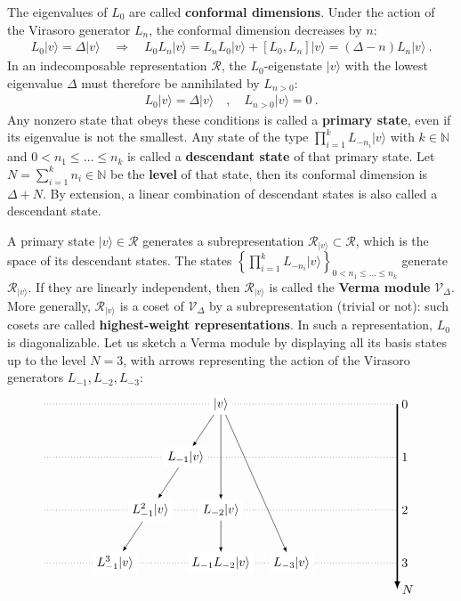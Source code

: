 \documentclass[12pt, a4paper]{article}
\theoremstyle{break}
\begin{document}
The eigenvalues of $L_0$ are called \textbf{conformal dimensions}. Under the action of the Virasoro generator $L_n$, the conformal dimension decreases by $n$:
\begin{align}
 L_0|v\rangle = \Delta|v\rangle \quad \Rightarrow\quad  L_0 L_n|v\rangle = L_nL_0|v\rangle + [L_0, L_n] |v\rangle  = (\Delta-n)L_n|v\rangle \ .
\end{align}
In an indecomposable representation $\mathcal{R}$, the $L_0$-eigenstate $|v\rangle$ with the lowest eigenvalue $\Delta$ must therefore be annihilated by $L_{n>0}$:
\begin{align}
  L_0 |v\rangle = \Delta |v\rangle \quad , \quad L_{n>0} |v\rangle = 0\ .
 \end{align}
Any nonzero state that obeys these conditions is called a \textbf{primary state}, even if its eigenvalue is not the smallest. Any state of the type $\prod_{i=1}^k L_{-n_i} |v\rangle$ with $k\in\mathbb{N}$ and $ 0<n_1\leq \dots \leq n_k$ is called a \textbf{descendant state} of that primary state. Let  $N=\sum_{i=1}^k n_i \in\mathbb{N}$ be the  \textbf{level} of that state, then its conformal dimension is $\Delta+N$. By extension, a linear combination of descendant states is also called a descendant state. 

A primary state $|v\rangle \in \mathcal{R}$ generates a subrepresentation $\mathcal{R}_{|v\rangle}\subset\mathcal{R}$, which is the space of its descendant states. The states $\left\{\prod_{i=1}^k L_{-n_i} |v\rangle\right\}_{0<n_1\leq \dots \leq n_k}$ generate $\mathcal{R}_{|v\rangle}$. If they are linearly independent, then $\mathcal{R}_{|v\rangle}$ is called the \textbf{Verma module} $\mathcal{V}_\Delta$. More generally, $\mathcal{R}_{|v\rangle}$ is a coset of $\mathcal{V}_\Delta$ by a subrepresentation (trivial or not): such cosets are called \textbf{highest-weight representations}. In such a representation, $L_0$ is diagonalizable. 
Let us sketch a Verma module by displaying all its basis states up to the level $N=3$, with arrows representing the action of the Virasoro generators $L_{-1},L_{-2},L_{-3}$:
\begin{align}
 \begin{tikzpicture}[scale = .25, baseline=(current  bounding  box.center)]
  \draw[-latex, very thick] (20, 0) -- (20, -21) node [right] {$N$};
  \foreach \x in {0, ..., 3}
  {
  \draw [dotted] (-20, {-6*\x}) -- (20, {-6*\x}) node [right] {${\x}$};
  }
  \node[fill = white] at (0, 0) (0) {$|v\rangle$};
  \node[fill = white] at (-4,-6) (1) {$L_{-1}|v\rangle$};
  \node[fill = white] at (-8, -12) (11) {$L_{-1}^2|v\rangle$};
  \node[fill = white] at (-12, -18) (111) {$L_{-1}^3|v\rangle$};
  \node[fill = white] at (0,-12) (2) {$L_{-2}|v\rangle$};
  \node[fill = white] at (0,-18) (12) {$L_{-1}L_{-2}|v\rangle$};
  \node[fill = white] at (8,-18) (3) {$L_{-3}|v\rangle$};
  \draw[-latex] (0) -- (1);
  \draw[-latex] (1) -- (11);
  \draw[-latex] (11) -- (111);
  \draw[-latex] (0) -- (2);
  \draw[-latex] (0) -- (3);
  \draw[-latex] (2) -- (12);
 \end{tikzpicture}
\end{align}
\end{document}
